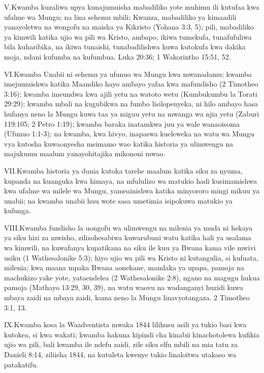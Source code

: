 \lettrine{V.} Kwamba kuzaliwa upya kunajumuisha mabadiliko yote muhimu ili kutufaa kwa ufalme wa Mungu; na lina sehemu mbili; Kwanza, mabadiliko ya kimaadili yanayoletwa na wongofu na maisha ya Kikristo (Yohana 3:3, 5); pili, mabadiliko ya kimwili katika ujio wa pili wa Kristo, ambapo, ikiwa tumekufa, tunafufuliwa bila kuharibika, na ikiwa tunaishi, tunabadilishwa kuwa kutokufa kwa dakika moja, ndani kufumba na kufumbua. Luka 20:36; 1 Wakorintho 15:51, 52.

\lettrine{VI.} Kwamba Unabii ni sehemu ya ufunuo wa Mungu kwa mwanadamu; kwamba imejumuishwa katika Maandiko hayo ambayo yafaa kwa mafundisho (2 Timotheo 3:16); kwamba imeundwa kwa ajili yetu na watoto wetu (Kumbukumbu la Torati 29:29); kwamba mbali na kugubikwa na fumbo lisilopenyeka, ni hilo ambayo hasa hufanya neno la Mungu kuwa taa ya miguu yetu na mwanga wa njia yetu (Zaburi 119:105; 2 Petro 1:19); kwamba baraka inatamkwa juu ya wale wanaoisoma (Ufunuo 1:1-3); na kwamba, kwa hivyo, inapaswa kueleweka na watu wa Mungu vya kutosha kuwaonyesha msimamo wao katika historia ya ulimwengu na majukumu maalum yanayohitajika mikononi mwao.

\lettrine{VII.} Kwamba historia ya dunia kutoka tarehe maalum katika siku za nyuma, kupanda na kuanguka kwa himaya, na mfululizo wa matukio hadi kusimamishwa kwa ufalme wa milele wa Mungu, yameainishwa katika minyororo mingi mikuu ya unabii; na kwamba unabii huu wote sasa umetimia isipokuwa matukio ya kufunga.

\lettrine{VIII.} Kwamba fundisho la uongofu wa ulimwengu na milenia ya muda ni hekaya ya siku hizi za mwisho, zilizohesabiwa kuwarubuni watu katika hali ya usalama wa kimwili, na kuwafanya kupatikana na siku ile kuu ya Bwana kama vile mwivi usiku (1 Wathesalonike 5:3); hiyo ujio wa pili wa Kristo ni kutangulia, si kufuata, milenia; kwa maana mpaka Bwana aonekane, mamlaka ya upapa, pamoja na machukizo yake yote, yataendelea (2 Wathesalonike 2:8), ngano na magugu hukua pamoja (Mathayo 13:29, 30, 39), na watu waovu na wadanganyi huzidi kuwa mbaya zaidi na mbaya zaidi, kama neno la Mungu linavyotangaza. 2 Timotheo 3:1, 13.

\lettrine{IX.} Kwamba kosa la Waadventista mwaka 1844 lilihusu asili ya tukio basi kwa kutokea, si kwa wakati; kwamba hakuna kipindi cha kinabii kinachotolewa kufikia ujio wa pili, bali kwamba ile ndefu zaidi, zile siku elfu mbili na mia tatu za Danieli 8:14, ziliisha 1844, na kutuleta kwenye tukio linaloitwa utakaso wa patakatifu.

